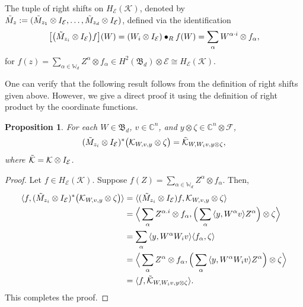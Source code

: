 \documentclass[12pt]{amsart}%
\newtheorem{proposition}[theorem]{Proposition}
\numberwithin{equation}{section}
\newcommand{\fB}{{\mathfrak{B}}}
\newcommand{\cle}{\mathcal{E}}
\newcommand{\clf}{\mathcal{F}}
\newcommand{\clk}{\mathcal{K}}
\newcommand{\C}{\mathbb{C}}
\newcommand\la{{\langle }}
\newcommand\ra{{\rangle}}
\begin{document}
The tuple of right shifts on $H_\cle(\clk)$, denoted by $\Tilde{M}_z:=(\Tilde{M}_{z_1} \otimes I_{\cle}, \ldots ,\Tilde{M}_{z_d}\otimes I_{\cle})$, defined via the identification 
\begin{align*}
\big[\big(\Tilde{M}_{z_i} \otimes I_{\cle} \big)f\big](W)= (W_i\otimes I_{\cle})\bullet_R f(W)=\sum_{\alpha} W^{\alpha \cdot i} \otimes f_\alpha,
\end{align*}
for $f(z)=\sum_{\alpha\in \mathbb{W}_d} Z^\alpha \otimes f_\alpha\in H^2(\fB_d)\otimes \cle \cong H_\cle(\clk)$. 

One can verify that the following result follows from the definition of right shifts given above. However, we give a direct proof it using the definition of right product by the coordinate functions.
\begin{proposition}\label{action_adj_right_shift}
For each $W\in \fB_d$, $v\in \C^n$, and $y\otimes \zeta\in \C^n\otimes \clf$,
\[
(\Tilde{M}_{z_i} \otimes I_{\cle})^*\big(\clk_{W, v, y}\otimes \zeta\big )= \Tilde{\clk}_{W, W_iv, y\otimes\zeta},
\]
where $\Tilde{\clk}=\clk\otimes I_{\cle}$.
\end{proposition}
\begin{proof}
Let $f\in H_\cle(\clk)$. Suppose $f(Z)=\sum_{\alpha\in \mathbb{W}_d} Z^\alpha \otimes f_\alpha$. Then,
\begingroup
 \allowdisplaybreaks
\begin{align*}
\langle f, (\Tilde{M}_{z_i} \otimes I_{\cle})^*\big(\clk_{W, v, y}\otimes \zeta\big)  \rangle&=\langle (\Tilde{M}_{z_i} \otimes I_{\cle}) f,  \clk_{W, v, y}\otimes \zeta \rangle\\
&=\Big\langle\sum_{\alpha} Z^{\alpha.i}\otimes  f_\alpha,\Big (\sum_{\alpha} \la y, W^\alpha v\ra Z^\alpha \Big )\otimes \zeta \Big\rangle\\
&=\sum_{\alpha}\la y, W^\alpha W_i v \ra\la f_{\alpha},\zeta \ra\\
&=\Big\langle\sum_{\alpha} Z^{\alpha}\otimes  f_\alpha,\Big (\sum_{\alpha} \la y, W^\alpha W_i v\ra Z^\alpha \Big )\otimes \zeta \Big\rangle\\
&= \langle f,  \Tilde{\clk}_{W, W_iv,y\otimes \zeta} \rangle.
\end{align*}
\endgroup
This completes the proof.
\end{proof}
\end{document}
